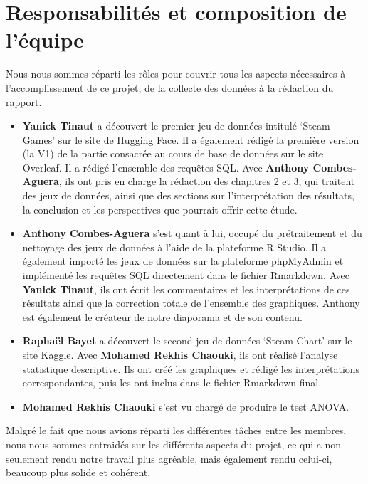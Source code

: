 \documentclass[mstat,12pt]{unswthesis}
\begin{document}
\hypertarget{responsabilituxe9s-et-composition-de-luxe9quipe}{%
\section{Responsabilités et composition de
l'équipe}\label{responsabilituxe9s-et-composition-de-luxe9quipe}}

Nous nous sommes réparti les rôles pour couvrir tous les aspects
nécessaires à l'accomplissement de ce projet, de la collecte des données
à la rédaction du rapport.

\begin{itemize}
\tightlist
\item
  \textbf{Yanick Tinaut} a découvert le premier jeu de données intitulé
  `Steam Games' sur le site de Hugging Face. Il a également rédigé la
  première version (la V1) de la partie consacrée au cours de base de
  données sur le site Overleaf. Il a rédigé l'ensemble des requêtes SQL.
  Avec \textbf{Anthony Combes-Aguera}, ils ont pris en charge la
  rédaction des chapitres 2 et 3, qui traitent des jeux de données,
  ainsi que des sections sur l'interprétation des résultats, la
  conclusion et les perspectives que pourrait offrir cette étude.
  \smallskip
\item
  \textbf{Anthony Combes-Aguera} s'est quant à lui, occupé du
  prétraitement et du nettoyage des jeux de données à l'aide de la
  plateforme R Studio. Il a également importé les jeux de données sur la
  plateforme phpMyAdmin et implémenté les requêtes SQL directement dans
  le fichier Rmarkdown. Avec \textbf{Yanick Tinaut}, ils ont écrit les
  commentaires et les interprétations de ces résultats ainsi que la
  correction totale de l'ensemble des graphiques. Anthony est également
  le créateur de notre diaporama et de son contenu. \smallskip
\item
  \textbf{Raphaël Bayet} a découvert le second jeu de données `Steam
  Chart' sur le site Kaggle. Avec \textbf{Mohamed Rekhis Chaouki}, ils
  ont réalisé l'analyse statistique descriptive. Ils ont créé les
  graphiques et rédigé les interprétations correspondantes, puis les ont
  inclus dans le fichier Rmarkdown final. \smallskip
\item
  \textbf{Mohamed Rekhis Chaouki} s'est vu chargé de produire le test
  ANOVA.
\end{itemize}

\bigskip

Malgré le fait que nous avions réparti les différentes tâches entre les
membres, nous nous sommes entraidés sur les différents aspects du
projet, ce qui a non seulement rendu notre travail plus agréable, mais
également rendu celui-ci, beaucoup plus solide et cohérent.
\end{document}
